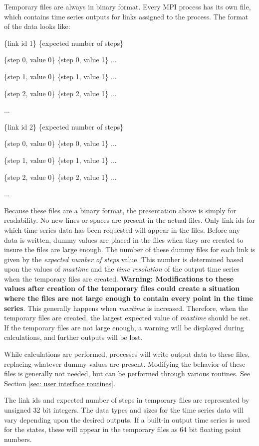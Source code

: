 \documentclass[12pt]{article}
\newenvironment{codeindent}
{\begin{list}{}
        {\setlength{\leftmargin}{.1in}}
        \item[]
}
{\end{list}}
\begin{document}
Temporary files are always in binary format. Every MPI process has its own file, which contains time series outputs for links assigned to the process. The format of the data looks like:
\begin{codeindent}
 \{link id 1\} \{expected number of steps\}
 
 \{step 0, value 0\} \{step 0, value 1\} ...

 \{step 1, value 0\} \{step 1, value 1\} ...
 
 \{step 2, value 0\} \{step 2, value 1\} ...
 
 ...
 
 \{link id 2\} \{expected number of steps\}
 
 \{step 0, value 0\} \{step 0, value 1\} ...
 
 \{step 1, value 0\} \{step 1, value 1\} ...
 
 \{step 2, value 0\} \{step 2, value 1\} ...
 
 ...
\end{codeindent}
Because these files are a binary format, the presentation above is simply for readability. No new lines or spaces are present in the actual files. Only link ids for which time series data has been requested will appear in the files. Before any data is written, dummy values are placed in the files when they are created to insure the files are large enough. The number of these dummy files for each link is given by the \emph{expected number of steps} value. This number is determined based upon the values of \emph{maxtime} and the \emph{time resolution} of the output time series when the temporary files are created. \textbf{Warning: Modifications to these values after creation of the temporary files could create a situation where the files are not large enough to contain every point in the time series}. This generally happens when \emph{maxtime} is increased. Therefore, when the temporary files are created, the largest expected value of \emph{maxtime} should be set. If the temporary files are not large enough, a warning will be displayed during calculations, and further outputs will be lost.

While calculations are performed, processes will write output data to these files, replacing whatever dummy values are present. Modifying the behavior of these files is generally not needed, but can be performed through various routines. See Section \ref{sec: user interface routines}.

The link ids and expected number of steps in temporary files are represented by unsigned 32 bit integers. The data types and sizes for the time series data will vary depending upon the desired outputs. If a built-in output time series is used for the states, these will appear in the temporary files as 64 bit floating point numbers.
\end{document}
